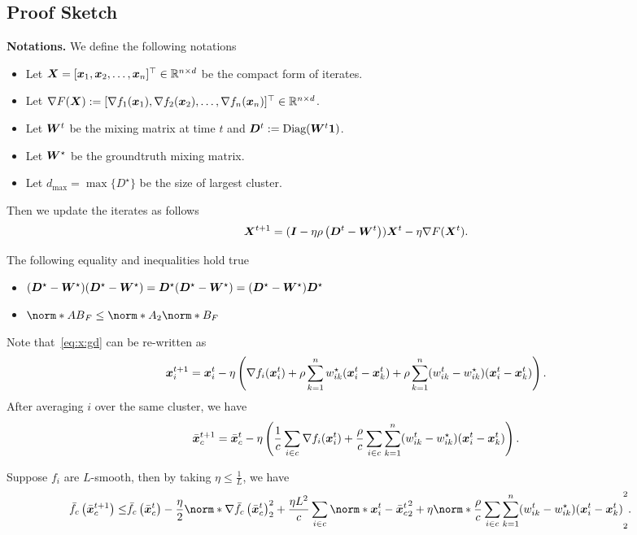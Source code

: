 \documentclass{article}
\begin{document}
\subsection{Proof Sketch}
\textbf{Notations.} We define the following notations
\begin{itemize}
  \item Let $\bm{X}=[\bm{x}_1, \bm{x}_2, \ldots, \bm{x}_n]^\top \in\mathbb{R}^{n\times d}$ be the compact form of iterates.
  \item Let $\nabla F(\bm{X}):= [\nabla f_1(\bm{x}_1), \nabla f_2(\bm{x}_2), \ldots, \nabla f_n(\bm{x}_n)]^\top \in\mathbb{R}^{n\times d}$.
  \item Let $\bm{W}^t$ be the mixing matrix at time $t$ and $\bm{D}^t:=\text{Diag}(\bm{W}^t\bm{1})$. 
  \item Let $\bm{W}^\star$ be the groundtruth mixing matrix.
  \item Let $d_\text{max}=\max\{D^\star\}$ be the size of largest cluster.
\end{itemize}
Then we update the iterates as follows
\begin{equation}
  \label{eq:X:iterate}
  \bm{X}^{t+1} = (\bm{I} - \eta\rho \left( \bm{D}^t - \bm{W}^t \right)) \bm{X}^t - \eta \nabla F(\bm{X}^t).
\end{equation}
\begin{lemma}
  The following equality and inequalities hold true
  \begin{itemize}
    \item $(\bm{D}^\star - \bm{W}^\star)(\bm{D}^\star - \bm{W}^\star)=\bm{D}^\star(\bm{D}^\star - \bm{W}^\star)=(\bm{D}^\star - \bm{W}^\star)\bm{D}^\star$
    \item $\norm*{AB}_F \le \norm*{A}_2 \norm*{B}_F $
  \end{itemize}
\end{lemma}
Note that~\eqref{eq:x:gd} can be re-written as 
\begin{align*}
  \bm{x}_i^{t+1}=\bm{x}_i^t - \eta \left(
    \nabla f_i(\bm{x}^t_i) + \rho \sum_{k=1}^n w^{\star}_{ik}(\bm{x}^t_i - \bm{x}^t_k)
    + \rho \sum_{k=1}^n (w^t_{ik}-w^{\star}_{ik})(\bm{x}^t_i - \bm{x}^t_k)
  \right).
\end{align*}
After averaging $i$ over the same cluster, we have
\begin{equation}\label{eq:xbar}
  \bar{\bm{x}}_c^{t+1}=\bar{\bm{x}}_c^t - \eta \left(
    \frac{1}{c}\sum_{i\in c}\nabla f_i(\bm{x}^t_i)
    + \frac{\rho}{c}\sum_{i\in c} \sum_{k=1}^n (w^t_{ik}-w^{\star}_{ik})(\bm{x}^t_i - \bm{x}^t_k)
  \right).
\end{equation}
\begin{lemma}
  \label{lemma:sd}  
  Suppose $f_i$ are $L$-smooth, then by taking $\eta\le \frac{1}{L}$, we have 
  \begin{align*}
    \bar{f}_c\left(\bar{\xx}_c^{t+1}\right)
     \le& \bar{f}_c\left(\bar{\xx}_c^{t}\right) 
     - \frac{\eta}{2} \norm*{\nabla \bar{f}_c\left(\bar{\xx}_c^{t}\right) }_2^2
     +  \frac{\eta L^2}{c}\sum_{i\in c} \norm*{ \xx^t_i - \bar{\xx}_c^{t} }_2^2
    +\eta \norm*{\frac{\rho}{c}\sum_{i\in c} \sum_{k=1}^n (w^t_{ik}-w^{\star}_{ik})(\xx^t_i - \xx^t_k)}_2^2.
  \end{align*}
\end{lemma}
\end{document}
